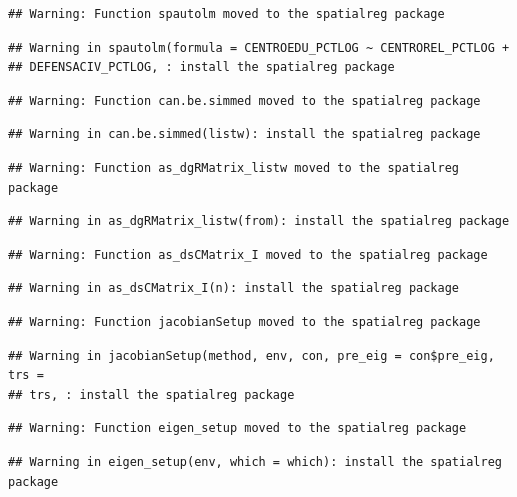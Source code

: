 \documentclass[11pt,]{article}
\begin{document}
\begin{verbatim}
## Warning: Function spautolm moved to the spatialreg package
\end{verbatim}

\begin{verbatim}
## Warning in spautolm(formula = CENTROEDU_PCTLOG ~ CENTROREL_PCTLOG +
## DEFENSACIV_PCTLOG, : install the spatialreg package
\end{verbatim}

\begin{verbatim}
## Warning: Function can.be.simmed moved to the spatialreg package
\end{verbatim}

\begin{verbatim}
## Warning in can.be.simmed(listw): install the spatialreg package
\end{verbatim}

\begin{verbatim}
## Warning: Function as_dgRMatrix_listw moved to the spatialreg package
\end{verbatim}

\begin{verbatim}
## Warning in as_dgRMatrix_listw(from): install the spatialreg package
\end{verbatim}

\begin{verbatim}
## Warning: Function as_dsCMatrix_I moved to the spatialreg package
\end{verbatim}

\begin{verbatim}
## Warning in as_dsCMatrix_I(n): install the spatialreg package
\end{verbatim}

\begin{verbatim}
## Warning: Function jacobianSetup moved to the spatialreg package
\end{verbatim}

\begin{verbatim}
## Warning in jacobianSetup(method, env, con, pre_eig = con$pre_eig, trs =
## trs, : install the spatialreg package
\end{verbatim}

\begin{verbatim}
## Warning: Function eigen_setup moved to the spatialreg package
\end{verbatim}

\begin{verbatim}
## Warning in eigen_setup(env, which = which): install the spatialreg package
\end{verbatim}
\end{document}
